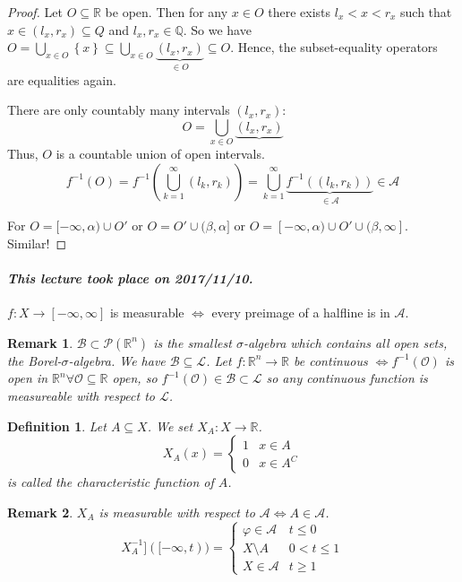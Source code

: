 \documentclass{article}
\newtheorem{definition}{Definition}  \numberwithin{definition}{section}
\newtheorem{remark}{Remark}  \numberwithin{remark}{section}
\newcommand{\set}[1]{\left\{#1\right\}}
\newcommand{\dateref}[1]{\paragraph{\textit{This lecture took place on #1.}}}
\begin{document}
\begin{proof}
  Let $O \subseteq \mathbb R$ be open. Then for any $x \in O$ there exists $l_x < x < r_x$ such that $x \in (l_x, r_x) \subseteq Q$ and $l_x, r_x \in \mathbb Q$. So we have $O = \bigcup_{x \in O} \set{x} \subseteq \bigcup_{x \in O}\underbrace{(l_x, r_x)}_{\in O} \subseteq O$. Hence, the subset-equality operators are equalities again.

  There are only countably many intervals $(l_x, r_x)$:
  \[ O = \bigcup_{x \in O} \underbrace{(l_x, r_x)} \]
  Thus, $O$ is a countable union of open intervals.
  \[ f^{-1}(O) = f^{-1}(\bigcup_{k=1}^\infty(l_k, r_k)) = \bigcup_{k=1}^\infty \underbrace{f^{-1}((l_k, r_k))}_{\in \mathcal A} \in \mathcal A \]

  For $O = [-\infty, \alpha) \cup O'$ or $O = O' \cup (\beta, \alpha]$ or $O = [-\infty, \alpha) \cup O' \cup (\beta, \infty]$.
  Similar!
\end{proof}

\dateref{2017/11/10}

$f: X \to [-\infty, \infty]$ is measurable $\Leftrightarrow$ every preimage of a halfline is in $\mathcal A$.

\begin{remark}
  $\mathcal B \subset \mathcal P(\mathbb R^n)$ is the smallest $\sigma$-algebra which contains all open sets, the Borel-$\sigma$-algebra.
  We have $\mathcal B \subseteq \mathcal L$.
  Let $f: \mathbb R^n \to \mathbb R$ be continuous $\Leftrightarrow f^{-1}(\mathcal O)$ is open in $\mathbb R^n \forall \mathcal O \subseteq \mathbb R$ open,
  so $f^{-1}(\mathcal O) \in \mathcal B \subset \mathcal L$ so any continuous function is measureable with respect to $\mathcal L$.
\end{remark}

\begin{definition}
  Let $A \subseteq X$. We set $X_A: X \to \mathbb R$.
  \[ X_A(x) = \begin{cases} 1 & x \in A \\ 0 & x \in A^C \end{cases} \]
  is called the \emph{characteristic function of $A$}.
\end{definition}

\begin{remark}
  $X_A$ is measurable with respect to $\mathcal A \Leftrightarrow A \in \mathcal A$.
  \[
    X_A^{-1}]([-\infty, t)) =
    \begin{cases}
      \varphi \in \mathcal A & t \leq 0 \\
      X \setminus A & 0 < t \leq 1 \\
      X \in \mathcal A & t \geq 1
    \end{cases}
  \]
\end{remark}
\end{document}
